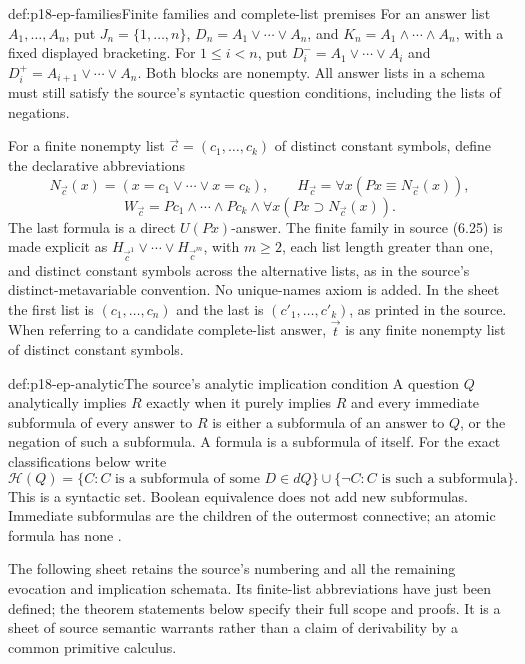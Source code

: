 \begin{hbdefinition}{def:p18-ep-families}{Finite families and complete-list premises}
For an answer list \(A_1,\ldots,A_n\), put
\(J_n=\{1,\ldots,n\}\),
\(D_n=A_1\lor\cdots\lor A_n\), and
\(K_n=A_1\land\cdots\land A_n\), with a fixed displayed bracketing.
For \(1\leq i<n\), put
\(D^-_i=A_1\lor\cdots\lor A_i\) and
\(D^+_i=A_{i+1}\lor\cdots\lor A_n\).
Both blocks are nonempty. All answer lists in a schema must still satisfy
the source's syntactic question conditions, including the lists of negations.

For a finite nonempty list \(\vec c=(c_1,\ldots,c_k)\) of distinct
constant symbols, define the declarative abbreviations
\[
 N_{\vec c}(x)=(x=c_1\lor\cdots\lor x=c_k),\qquad
 H_{\vec c}=\forall x(Px\equiv N_{\vec c}(x)),
\]
\[
 W_{\vec c}=Pc_1\land\cdots\land Pc_k\land
                 \forall x(Px\supset N_{\vec c}(x)).
\]
The last formula is a direct \(U(Px)\)-answer. The finite family in
source (6.25) is made explicit as \(H_{\vec c^{1}}\lor\cdots\lor
H_{\vec c^{m}}\), with \(m\geq2\), each list length greater than
one, and distinct constant symbols across the alternative lists, as in
the source's distinct-metavariable convention. No unique-names axiom is
added. In the sheet the first list is \((c_1,\ldots,c_n)\) and the
last is \((c'_1,\ldots,c'_k)\), as printed in the source.
When referring to a candidate complete-list answer,
\(\vec t\) is any finite nonempty list of distinct constant symbols.
\end{hbdefinition}

\begin{hbdefinition}{def:p18-ep-analytic}{The source's analytic implication condition}
A question \(Q\) analytically implies \(R\) exactly when it purely
implies \(R\) and every immediate subformula of every answer to \(R\)
is either a subformula of an answer to \(Q\), or the negation of such
a subformula. A formula is a subformula of itself.
For the exact classifications below write
\[
 \mathcal H(Q)=\{C:C\text{ is a subformula of some }D\in dQ\}
 \cup\{\neg C:C\text{ is such a subformula}\}.
\]
This is a syntactic set. Boolean equivalence does not add new subformulas.
Immediate subformulas are the children of the outermost connective;
an atomic formula has none
\cite[p.~27, Definition~11 and note~14]{Wisniewski2001QuestionsInferences}.
\end{hbdefinition}

The following sheet retains the source's numbering and all the remaining
evocation and implication schemata. Its finite-list abbreviations have just
been defined; the theorem statements below specify their full scope and
proofs. It is a sheet of source semantic warrants rather than a claim of
derivability by a common primitive calculus.


